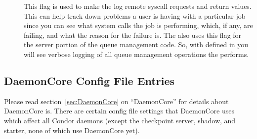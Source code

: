 \begin{description}
\begin{description}
\item[] \label{dflag:syscalls} This flag is used to
  make the  log remote syscall requests and return
  values.  This can help track down problems a user is having with a
  particular job since you can see what system calls the job is
  performing, which, if any, are failing, and what the reason for the
  failure is.  The  also uses this flag for the server
  portion of the queue management code.  So, with 
  defined in  you will see verbose logging of all
  queue management operations the  performs.  

\label{list:debug level description}
\end{description}

\end{description}

\subsection{DaemonCore Config File Entries}
\label{sec:DaemonCore-Config-File-Entries}

Please read section~\ref{sec:DaemonCore} on ``DaemonCore'' for details
about DaemonCore is.  There are certain config file settings that
DaemonCore uses which affect all Condor daemons (except the checkpoint
server, shadow, and starter, none of which use DaemonCore yet).

